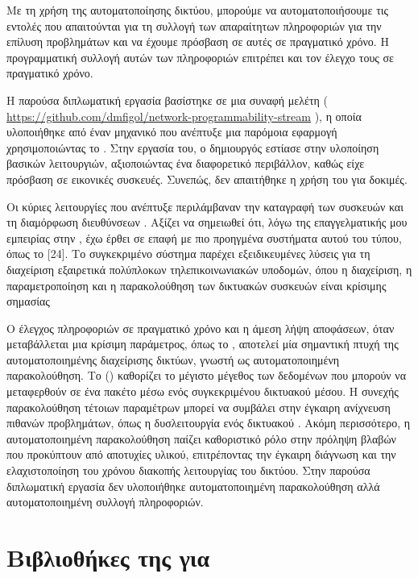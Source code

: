 Με τη χρήση της αυτοματοποίησης δικτύου, μπορούμε να αυτοματοποιήσουμε τις εντολές που απαιτούνται για τη 
συλλογή των απαραίτητων πληροφοριών για την επίλυση προβλημάτων και να έχουμε πρόσβαση σε αυτές σε πραγματικό χρόνο.
Η προγραμματική συλλογή αυτών των πληροφοριών επιτρέπει και τον έλεγχο τους σε πραγματικό χρόνο. 

Η παρούσα διπλωματική εργασία βασίστηκε σε μια συναφή μελέτη ( \url{https://github.com/dmfigol/network-programmability-stream} ), η οποία υλοποιήθηκε από έναν μηχανικό που ανέπτυξε μια παρόμοια εφαρμογή χρησιμοποιώντας το . Στην εργασία του, ο δημιουργός εστίασε στην υλοποίηση βασικών λειτουργιών, αξιοποιώντας ένα διαφορετικό περιβάλλον, καθώς είχε πρόσβαση σε εικονικές συσκευές. Συνεπώς, δεν απαιτήθηκε η χρήση του  για δοκιμές.

Οι κύριες λειτουργίες που ανέπτυξε περιλάμβαναν την καταγραφή των συσκευών και τη διαμόρφωση διευθύνσεων . Αξίζει να σημειωθεί ότι, λόγω της επαγγελματικής μου εμπειρίας στην , έχω έρθει σε επαφή με πιο προηγμένα συστήματα αυτού του τύπου, όπως το [24]. Το συγκεκριμένο σύστημα παρέχει εξειδικευμένες λύσεις για τη διαχείριση εξαιρετικά πολύπλοκων τηλεπικοινωνιακών υποδομών, όπου η διαχείριση, η παραμετροποίηση και η παρακολούθηση των δικτυακών συσκευών είναι κρίσιμης σημασίας

Ο έλεγχος πληροφοριών σε πραγματικό χρόνο και η άμεση λήψη αποφάσεων, όταν μεταβάλλεται μια κρίσιμη παράμετρος, όπως το , αποτελεί μία σημαντική πτυχή της αυτοματοποιημένης διαχείρισης δικτύων, γνωστή ως αυτοματοποιημένη παρακολούθηση.
Το  () καθορίζει το μέγιστο μέγεθος των δεδομένων που μπορούν να μεταφερθούν σε ένα πακέτο μέσω ενός συγκεκριμένου δικτυακού μέσου. Η συνεχής παρακολούθηση τέτοιων παραμέτρων μπορεί να συμβάλει στην έγκαιρη ανίχνευση πιθανών προβλημάτων, όπως η δυσλειτουργία ενός δικτυακού .
Ακόμη περισσότερο, η αυτοματοποιημένη παρακολούθηση παίζει καθοριστικό ρόλο στην πρόληψη βλαβών που προκύπτουν από αποτυχίες υλικού, επιτρέποντας την έγκαιρη διάγνωση και την ελαχιστοποίηση του χρόνου διακοπής λειτουργίας του δικτύου. Στην παρούσα διπλωματική εργασία δεν υλοποιήθηκε αυτοματοποιημένη παρακολούθηση αλλά αυτοματοποιημένη συλλογή πληροφοριών.


\section{Βιβλιοθήκες της  για }

